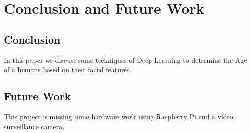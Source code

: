 \chapter{Conclusion and Future Work}
\label{chap:Five}
\section{Conclusion}
\label{sec:conclusion}
In this paper we discuss some  techniques of Deep Learning to determine the Age of a humans  based on their facial features. 

\section{Future Work}
\label{sec:futureWork}
This project is missing some hardware work using Raspberry Pi and a video surveillance camera.